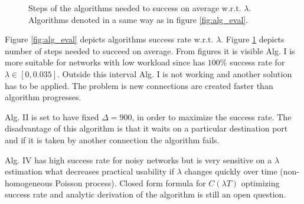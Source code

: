 \documentclass[twoside]{article}
\begin{document}
\begin{multicols}{2}
\begin{figure}[H]
{}
\caption{Steps of the algorithms needed to success on average w.r.t. $\lambda$. Algorithms denoted in a same way as in figure \ref{fig:alg_eval}.}
\label{fig:alg_steps}
\end{figure}
Figure \ref{fig:alg_eval} depicts algorithms success rate w.r.t. $\lambda$. 
Figure \ref{fig:alg_steps} depicts number of steps needed 
to succeed on average. From figures it is visible Alg. I is more suitable for networks with low 
workload since has $100\%$ success rate for $\lambda \in [0, 0.035]$. Outside this interval 
Alg. I is not working and another solution has to be applied. The problem is new connections are
created faster than algorithm progresses.

Alg. II is set to have fixed $\Delta=900$, in order to maximize the success rate. The disadvantage of this
algorithm is that it waits on a particular destination port and if it is taken by another connection
the algorithm fails. 

Alg. IV has high success rate for 
noisy networks but is very sensitive on a $\lambda$ estimation what decreases practical usability 
if $\lambda$ changes quickly over time (non-homogeneous Poisson process). Closed form formula for $C(\lambda T)$ 
optimizing success rate and analytic derivation of the algorithm is still an open question. 



\end{multicols}
\end{document}
